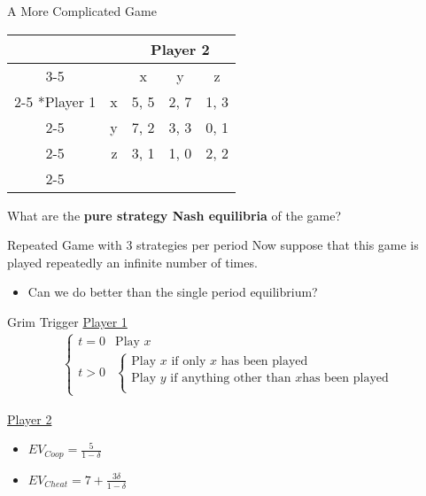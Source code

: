 
\begin{frame}{A More Complicated Game}
  \begin{center}
  \begin{tabular}{cr|c|c|c|}
  	& \multicolumn{1}{c}{} & \multicolumn{3}{c}{Player 2}\\ \cline{3-5}
    \multicolumn{1}{c}{} & \multicolumn{1}{c}{} & x & y & z \\\cline{2-5}
    \multirow{3}*{Player 1}  & x & 5, 5 & 2, 7 & 1, 3 \\\cline{2-5}
                             & y & 7, 2 & 3, 3 & 0, 1 \\\cline{2-5}
                             & z & 3, 1 & 1, 0 & 2, 2 \\\cline{2-5}
  \end{tabular}
  \end{center}

  What are the \textbf{pure strategy Nash equilibria} of the  game?
\end{frame}

\begin{frame}{Repeated Game with 3 strategies per period}
  Now suppose that this game is played repeatedly an infinite number of times.  
  \begin{itemize}
    \item Can we do better than the single period equilibrium? 
  \end{itemize}
\end{frame}

\begin{frame}{Grim Trigger}
  \underline{Player 1} 
  \begin{align*}
    \begin{cases}
      t = 0 & \text{Play } x  \\ 
      t > 0 & 
      \begin{cases}
        \text{Play } x \text{ if only } x \text{ has been played } \\
        \text{Play } y \text{ if anything other than } x \text{has been played} \\
      \end{cases}
    \end{cases} 
  \end{align*}

  \underline{Player 2}
  \begin{itemize}
    \item $EV_{Coop} = \frac{5}{1-\delta}$ 
    \item $EV_{Cheat} = 7 + \frac{3\delta}{1-\delta}$
  \end{itemize}
\end{frame}

